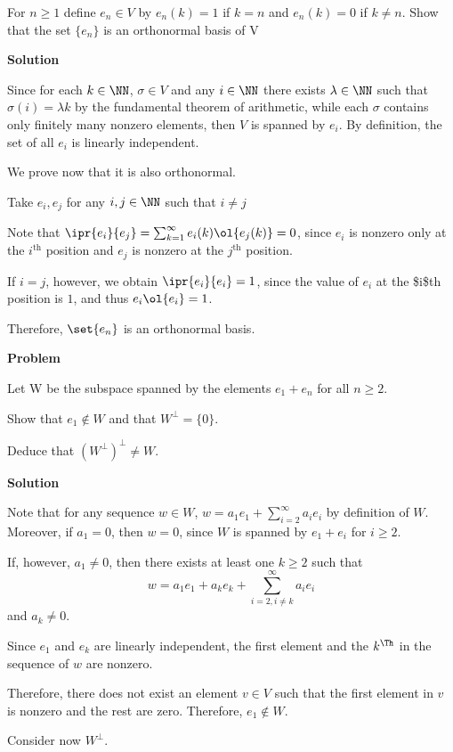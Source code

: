 \documentclass[11pt]{scrartcl}
\begin{document}
For \(n \ge 1\) define \(e_n \in V\) by \(e_n(k) = 1\) if \(k=n\) and \(e_n(k)
= 0\) if \(k\ne n\). Show that the set \(\{e_n\}\) is an orthonormal basis
of V

\textbf{Solution}

Since for each \(k\in \NN\), \(\sigma \in V\) and any \(i\in \NN\) there
exists \(\lambda \in \NN\) such that \(\sigma(i) = \lambda k\) by the
fundamental theorem of arithmetic, while each \(\sigma\) contains only
finitely many nonzero elements, then \(V\) is spanned by \(e_i\). By
definition, the set of all \(e_i\) is linearly independent.

We prove now that it is also orthonormal.

Take \(e_i, e_j\) for any \(i, j \in \NN\) such that \(i\neq j\)

Note that \(\ipr{e_i}{e_j}=\sum_{k=1}^{\infty} e_i(k)\ol{e_j(k)} = 0\),
since \(e_i\) is nonzero only at the \(i^{\text{th}}\) position and \(e_j\)
is nonzero at the \(j^{\text{th}}\) position.

If \(i=j\), however, we obtain \(\ipr{e_i}{e_i}=1\), since the value of
\(e_i\) at the \$i\$th position is \(1\), and thus \(e_i\ol{e_i} = 1\).

Therefore, \(\set{e_n}\) is an orthonormal basis.

\textbf{Problem} 

Let W be the subspace spanned by the elements \(e_1 + e_n\) for all \(n \ge 2\).

Show that \(e_1 \not\in W\) and that \(W^\perp = \{0\}\). 

Deduce that \((W^\perp)^\perp \ne W\).

\textbf{Solution}

Note that for any sequence \(w\in W\), \(w = a_1e_1 +
\sum_{i=2}^{\infty}a_ie_{i}\) by definition of \(W\). Moreover, if \(a_1=
0\), then \(w = 0\), since \(W\) is spanned by \(e_1+e_i\) for \(i\geq 2\). 

If, however, \(a_1\neq 0\), then there exists at least one \(k\geq 2\)
such that 
\[w = a_1e_1 + a_ke_k + \sum_{i=2, i\neq k}^{\infty}a_ie_i\] and \(a_{k}\neq 0\).

Since \(e_1\) and \(e_k\) are linearly independent, the first element and
the \(k^{\Th}\) in the sequence of \(w\) are nonzero.

Therefore, there does not exist an element \(v\in V\) such that the
first element in \(v\) is nonzero and the rest are zero. Therefore, \(e_1 \not\in W\).

Consider now \(W^{\bot}\).
\end{document}
